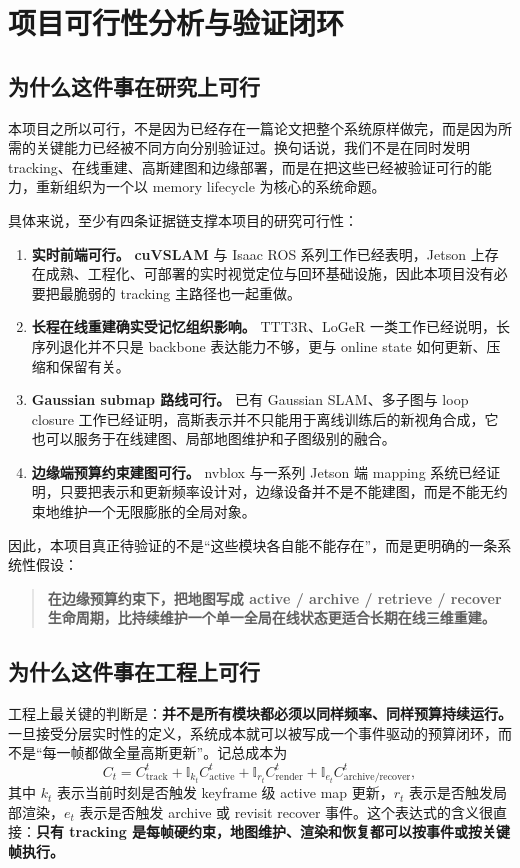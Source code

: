 \documentclass[12pt]{article}
\newcommand{\cuvslam}{\textbf{cuVSLAM}}
\begin{document}
\section{项目可行性分析与验证闭环}

\subsection{为什么这件事在研究上可行}

本项目之所以可行，不是因为已经存在一篇论文把整个系统原样做完，而是因为所需的关键能力已经被不同方向分别验证过。换句话说，我们不是在同时发明 tracking、在线重建、高斯建图和边缘部署，而是在把这些已经被验证可行的能力，重新组织为一个以 memory lifecycle 为核心的系统命题。

具体来说，至少有四条证据链支撑本项目的研究可行性：
\begin{enumerate}
  \item \textbf{实时前端可行。} \cuvslam{} 与 Isaac ROS 系列工作已经表明，Jetson 上存在成熟、工程化、可部署的实时视觉定位与回环基础设施，因此本项目没有必要把最脆弱的 tracking 主路径也一起重做。
  \item \textbf{长程在线重建确实受记忆组织影响。} TTT3R、LoGeR 一类工作已经说明，长序列退化并不只是 backbone 表达能力不够，更与 online state 如何更新、压缩和保留有关。
  \item \textbf{Gaussian submap 路线可行。} 已有 Gaussian SLAM、多子图与 loop closure 工作已经证明，高斯表示并不只能用于离线训练后的新视角合成，它也可以服务于在线建图、局部地图维护和子图级别的融合。
  \item \textbf{边缘端预算约束建图可行。} nvblox 与一系列 Jetson 端 mapping 系统已经证明，只要把表示和更新频率设计对，边缘设备并不是不能建图，而是不能无约束地维护一个无限膨胀的全局对象。
\end{enumerate}

因此，本项目真正待验证的不是“这些模块各自能不能存在”，而是更明确的一条系统性假设：
\begin{quote}
\textbf{在边缘预算约束下，把地图写成 active / archive / retrieve / recover 生命周期，比持续维护一个单一全局在线状态更适合长期在线三维重建。}
\end{quote}

\subsection{为什么这件事在工程上可行}

工程上最关键的判断是：\textbf{并不是所有模块都必须以同样频率、同样预算持续运行。} 一旦接受分层实时性的定义，系统成本就可以被写成一个事件驱动的预算闭环，而不是“每一帧都做全量高斯更新”。记总成本为
\begin{equation}
C_t = C_{\text{track}}^t + \mathbb{I}_{k_t} C_{\text{active}}^t + \mathbb{I}_{r_t} C_{\text{render}}^t + \mathbb{I}_{e_t} C_{\text{archive/recover}}^t,
\end{equation}
其中 $k_t$ 表示当前时刻是否触发 keyframe 级 active map 更新，$r_t$ 表示是否触发局部渲染，$e_t$ 表示是否触发 archive 或 revisit recover 事件。这个表达式的含义很直接：\textbf{只有 tracking 是每帧硬约束，地图维护、渲染和恢复都可以按事件或按关键帧执行。}
\end{document}
